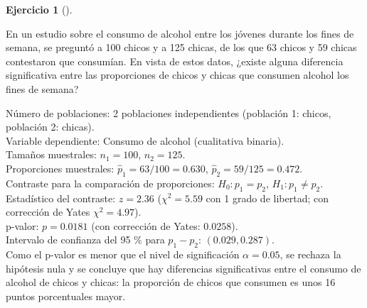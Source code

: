 \documentclass[
  spanish,
  a4paper,
]{scrreport}
\theoremstyle{definition}
\newtheorem{exercise}{Ejercicio}[chapter]
\theoremstyle{remark}
\begin{document}
\begin{exercise}[]\protect\hypertarget{exr-contraste-proporcion-consumo-alcohol}{}\label{exr-contraste-proporcion-consumo-alcohol}

En un estudio sobre el consumo de alcohol entre los jóvenes durante los
fines de semana, se preguntó a 100 chicos y a 125 chicas, de los que 63
chicos y 59 chicas contestaron que consumían. En vista de estos datos,
¿existe alguna diferencia significativa entre las proporciones de chicos
y chicas que consumen alcohol los fines de semana?

\end{exercise}

\begin{tcolorbox}[enhanced jigsaw, arc=.35mm, bottomrule=.15mm, bottomtitle=1mm, breakable, colback=white, colbacktitle=quarto-callout-tip-color!10!white, colframe=quarto-callout-tip-color-frame, coltitle=black, left=2mm, leftrule=.75mm, opacityback=0, opacitybacktitle=0.6, rightrule=.15mm, title=\textcolor{quarto-callout-tip-color}{\faLightbulb}\hspace{0.5em}{Solución}, titlerule=0mm, toprule=.15mm, toptitle=1mm]

Número de poblaciones: 2 poblaciones independientes (población 1:
chicos, población 2: chicas).\\
Variable dependiente: Consumo de alcohol (cualitativa binaria).\\
Tamaños muestrales: \(n_1=100\), \(n_2=125\).\\
Proporciones muestrales: \(\hat p_1=63/100=0.630\),
\(\hat p_2=59/125=0.472\).\\
Contraste para la comparación de proporciones: \(H_0:p_1=p_2\),
\(H_1:p_1\neq p_2\).\\
Estadístico del contraste: \(z=2.36\) (\(\chi^2=5.59\) con 1 grado de
libertad; con corrección de Yates \(\chi^2=4.97\)).\\
p-valor: \(p=0.0181\) (con corrección de Yates: \(0.0258\)).\\
Intervalo de confianza del 95 \% para \(p_1-p_2\): \((0.029, 0.287)\).\\
Como el p-valor es menor que el nivel de significación \(\alpha=0.05\),
se rechaza la hipótesis nula y se concluye que hay diferencias
significativas entre el consumo de alcohol de chicos y chicas: la
proporción de chicos que consumen es unos 16 puntos porcentuales mayor.

\end{tcolorbox}
\end{document}
